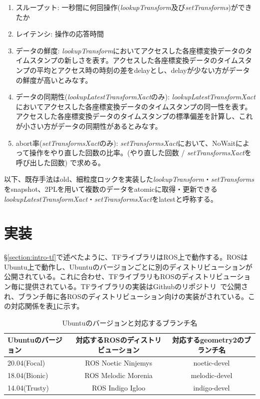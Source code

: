 \documentclass[a4paper]{jreport}	%
\begin{document}
\begin{enumerate}
	\item スループット: 一秒間に何回操作(\textit{lookupTransform}及び\textit{setTransforms})ができたか
	\item レイテンシ: 操作の応答時間
	\item データの鮮度: \textit{lookupTransform}においてアクセスした各座標変換データのタイムスタンプの新しさを表す。アクセスした各座標変換データのタイムスタンプの平均とアクセス時の時刻の差をdelayとし、delayが少ない方がデータの鮮度が高いとみなす。
	\item データの同期性(\textit{lookupLatestTransformXact}のみ): \textit{lookupLatestTransformXact}においてアクセスした各座標変換データのタイムスタンプの同一性を表す。アクセスした各座標変換データのタイムスタンプの標準偏差を計算し、これが小さい方がデータの同期性があるとみなす。
	\item abort率(\textit{setTransformsXact}のみ): \textit{setTransformsXact}において、NoWaitによって操作をやり直した回数の比率。(やり直した回数 / \textit{setTransformsXact}を呼び出した回数) で求める。
\end{enumerate}

以下、既存手法はold、細粒度ロックを実装した\textit{lookupTransform}・\textit{setTransforms}をsnapshot、2PLを用いて複数のデータをatomicに取得・更新できる\textit{lookupLatestTransformXact}・\textit{setTransformsXact}をlatestと呼称する。

\section{実装}
§\ref{section:intro-tf}で述べたように、TFライブラリはROS上で動作する。ROSはUbuntu上で動作し、Ubuntuのバージョンごとに別のディストリビューションが公開されている。これに合わせ、TFライブラリもROSのディストリビューション毎に提供されている。TFライブラリの実装はGithubのリポジトリ~\cite{ros-geometry2}で公開され、ブランチ毎に各ROSのディストリビューション向けの実装がされている。この対応関係を表\ref{table:ubuntu-ros-branch}に示す。

\begin{table}[ht]
\centering
\begin{tabular}[t]{lcc}
\hline
Ubuntuのバージョン & 対応するROSのディストリビューション & 対応するgeometry2のブランチ名\\
\hline
20.04(Focal) & ROS Noetic Ninjemys & noetic-devel \\
18.04(Bionic) & ROS Melodic Morenia & melodic-devel \\
14.04(Trusty) & ROS Indigo Igloo & indigo-devel \\
\hline
\end{tabular}
\caption{Ubuntuのバージョンと対応するブランチ名}
\label{table:ubuntu-ros-branch}
\end{table}%
\end{document}
